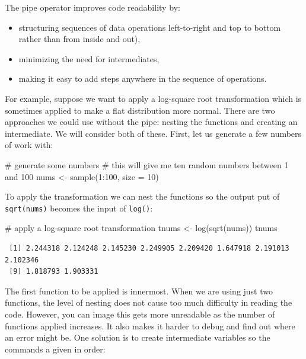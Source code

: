 \documentclass[
  letterpaper,
  DIV=11,
  numbers=noendperiod]{scrreprt}
\newenvironment{Shaded}{\begin{snugshade}}{\end{snugshade}}
\newcommand{\AttributeTok}[1]{\textcolor[rgb]{0.40,0.45,0.13}{#1}}
\newcommand{\CommentTok}[1]{\textcolor[rgb]{0.37,0.37,0.37}{#1}}
\newcommand{\DecValTok}[1]{\textcolor[rgb]{0.68,0.00,0.00}{#1}}
\newcommand{\FunctionTok}[1]{\textcolor[rgb]{0.28,0.35,0.67}{#1}}
\newcommand{\NormalTok}[1]{\textcolor[rgb]{0.00,0.23,0.31}{#1}}
\newcommand{\OtherTok}[1]{\textcolor[rgb]{0.00,0.23,0.31}{#1}}
\newcommand{\SpecialCharTok}[1]{\textcolor[rgb]{0.37,0.37,0.37}{#1}}
\providecommand{\tightlist}{%
  \setlength{\itemsep}{0pt}\setlength{\parskip}{0pt}}\usepackage{longtable,booktabs,array}
\begin{document}
The pipe operator improves code readability by:

\begin{itemize}
\tightlist
\item
  structuring sequences of data operations left-to-right and top to
  bottom rather than from inside and out),
\item
  minimizing the need for intermediates,
\item
  making it easy to add steps anywhere in the sequence of operations.
\end{itemize}

For example, suppose we want to apply a log-square root transformation
which is sometimes applied to make a flat distribution more normal.
There are two approaches we could use without the pipe: nesting the
functions and creating an intermediate. We will consider both of these.
First, let us generate a few numbers of work with:

\begin{Shaded}
\begin{Highlighting}[]
\CommentTok{\# generate some numbers}
\CommentTok{\# this will give me ten random numbers between 1 and 100}
\NormalTok{nums }\OtherTok{\textless{}{-}} \FunctionTok{sample}\NormalTok{(}\DecValTok{1}\SpecialCharTok{:}\DecValTok{100}\NormalTok{, }\AttributeTok{size =} \DecValTok{10}\NormalTok{)}
\end{Highlighting}
\end{Shaded}

To apply the transformation we can nest the functions so the output put
of \texttt{sqrt(nums)} becomes the input of \texttt{log()}:

\begin{Shaded}
\begin{Highlighting}[]
\CommentTok{\# apply a log{-}square root transformation}
\NormalTok{tnums }\OtherTok{\textless{}{-}} \FunctionTok{log}\NormalTok{(}\FunctionTok{sqrt}\NormalTok{(nums))}
\NormalTok{tnums}
\end{Highlighting}
\end{Shaded}

\begin{verbatim}
 [1] 2.244318 2.124248 2.145230 2.249905 2.209420 1.647918 2.191013 2.102346
 [9] 1.818793 1.903331
\end{verbatim}

The first function to be applied is innermost. When we are using just
two functions, the level of nesting does not cause too much difficulty
in reading the code. However, you can image this gets more unreadable as
the number of functions applied increases. It also makes it harder to
debug and find out where an error might be. One solution is to create
intermediate variables so the commands a given in order:
\end{document}
